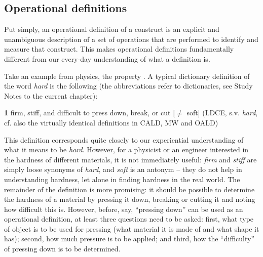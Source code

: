 
\subsection{Operational definitions}
\label{sec:operationaldefinitions}

Put simply, an operational  definition of a construct is an explicit and unambiguous description of a set of operations that are performed to identify and measure  that construct. This makes operational definitions fundamentally different from our every\hyp{}day understanding of what a definition is.

Take an example from physics, the property . A typical dictionary  definition of the word \textit{hard} is the following (the abbreviations refer to dictionaries, see Study Notes to the current chapter):

\begin{exe}
\ex \textbf{1}  firm, stiff, and difficult to press down, break, or cut [$\neq$ soft] (LDCE, s.v. \textit{hard}, cf. also the virtually identical definitions in CALD, MW and OALD)
\label{ex:label}
\end{exe}

This definition corresponds quite closely to our experiential understanding of what it means to be \textit{hard}. However, for a physicist or an engineer interested in the hardness of different materials, it is not immediately useful: \textit{firm} and \textit{stiff} are simply loose synonyms  of \textit{hard}, and \textit{soft} is an antonym  -- they do not help in understanding hardness, let alone in finding hardness in the real world. The remainder of the definition is more promising: it should be possible to determine the hardness of a material by pressing it down, breaking or cutting it and noting how difficult this is. However, before, say, ``pressing down'' can be used as an operational  definition, at least three questions need to be asked: first, what type of object is to be used for pressing (what material it is made of and what shape it has); second, how much pressure is to be applied; and third, how the ``difficulty'' of pressing down is to be determined.


